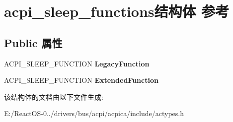 \hypertarget{structacpi__sleep__functions}{}\section{acpi\+\_\+sleep\+\_\+functions结构体 参考}
\label{structacpi__sleep__functions}
\subsection*{Public 属性}
\begin{DoxyCompactItemize}
\item 
\mbox{\label{structacpi__sleep__functions_a7212d312f0f13ad7ef290e8894cdc392}} 
A\+C\+P\+I\+\_\+\+S\+L\+E\+E\+P\+\_\+\+F\+U\+N\+C\+T\+I\+ON {\bfseries Legacy\+Function}
\item 
\mbox{\label{structacpi__sleep__functions_ab1fb1400a54fb03b0774d012506bfc6f}} 
A\+C\+P\+I\+\_\+\+S\+L\+E\+E\+P\+\_\+\+F\+U\+N\+C\+T\+I\+ON {\bfseries Extended\+Function}
\end{DoxyCompactItemize}


该结构体的文档由以下文件生成\+:\begin{DoxyCompactItemize}
\item 
E\+:/\+React\+O\+S-\/0../drivers/bus/acpi/acpica/include/actypes.\+h\end{DoxyCompactItemize}
